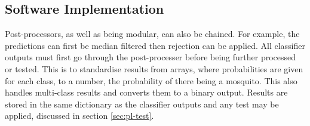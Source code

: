     \subsection{Software Implementation}
    \label{subsec:pl-postproc-software}
        Post-processors, as well as being modular, can also be chained. For example, the predictions can first be median filtered then rejection can be applied. All classifier outputs must first go through the  post-processer before being further processed or tested. This is to standardise results from arrays, where probabilities are given for each class, to a number, the probability of there being a mosquito. This also handles multi-class results and converts them to a binary output. Results are stored in the same dictionary as the classifier outputs and any test may be applied, discussed in section \ref{sec:pl-test}.
